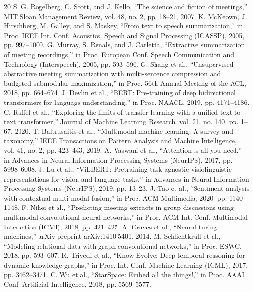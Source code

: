 \cleardoublepage
{}
\begin{thebibliography}{20}
 S. G. Rogelberg, C. Scott, and J. Kello, ``The science and fiction of meetings,'' MIT Sloan Management Review, vol. 48, no. 2, pp. 18–21, 2007.
 K. McKeown, J. Hirschberg, M. Galley, and S. Maskey, ``From text to speech summarization,'' in Proc. IEEE Int. Conf. Acoustics, Speech and Signal Processing (ICASSP), 2005, pp. 997–1000.
 G. Murray, S. Renals, and J. Carletta, ``Extractive summarization of meeting recordings,'' in Proc. European Conf. Speech Communication and Technology (Interspeech), 2005, pp. 593–596.
 G. Shang et al., ``Unsupervised abstractive meeting summarization with multi-sentence compression and budgeted submodular maximization,'' in Proc. 56th Annual Meeting of the ACL, 2018, pp. 664–674.
 J. Devlin et al., ``BERT: Pre-training of deep bidirectional transformers for language understanding,'' in Proc. NAACL, 2019, pp. 4171–4186.
 C. Raffel et al., ``Exploring the limits of transfer learning with a unified text-to-text transformer,'' Journal of Machine Learning Research, vol. 21, no. 140, pp. 1–67, 2020.
 T. Baltrusaitis et al., ``Multimodal machine learning: A survey and taxonomy,'' IEEE Transactions on Pattern Analysis and Machine Intelligence, vol. 41, no. 2, pp. 423–443, 2019.
 A. Vaswani et al., ``Attention is all you need,'' in Advances in Neural Information Processing Systems (NeurIPS), 2017, pp. 5998–6008.
 J. Lu et al., ``ViLBERT: Pretraining task-agnostic visiolinguistic representations for vision-and-language tasks,'' in Advances in Neural Information Processing Systems (NeurIPS), 2019, pp. 13–23.
 J. Tao et al., ``Sentiment analysis with contextual multi-modal fusion,'' in Proc. ACM Multimedia, 2020, pp. 1140–1148.
 F. Nihei et al., ``Predicting meeting extracts in group discussions using multimodal convolutional neural networks,'' in Proc. ACM Int. Conf. Multimodal Interaction (ICMI), 2018, pp. 421–425.
 A. Graves et al., ``Neural turing machines,'' arXiv preprint arXiv:1410.5401, 2014.
 M. Schlichtkrull et al., ``Modeling relational data with graph convolutional networks,'' in Proc. ESWC, 2018, pp. 593–607.
 R. Trivedi et al., ``Know-Evolve: Deep temporal reasoning for dynamic knowledge graphs,'' in Proc. Int. Conf. Machine Learning (ICML), 2017, pp. 3462–3471.
 C. Wu et al., ``StarSpace: Embed all the things!,'' in Proc. AAAI Conf. Artificial Intelligence, 2018, pp. 5569–5577.

\end{thebibliography}
